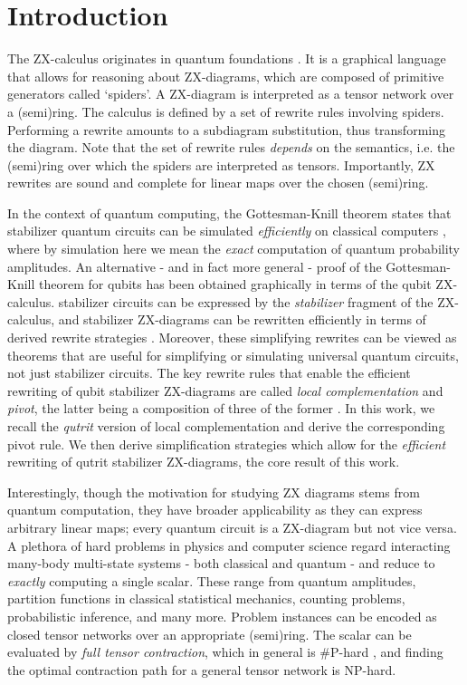 \section{Introduction}



The ZX-calculus originates in
quantum foundations \cite{Coecke2011}.
It is a graphical language that allows for reasoning about ZX-diagrams, which are composed of primitive generators \cite{vandewetering2020zxcalculus} called `spiders'.
A ZX-diagram is interpreted as a tensor network over
a (semi)ring.
The calculus
is defined by a set of rewrite rules involving spiders. Performing a rewrite amounts to a
subdiagram substitution, thus transforming the diagram.
Note that the set of rewrite rules \emph{depends} on the semantics, i.e. the (semi)ring over which the spiders are interpreted as tensors.
Importantly, ZX rewrites are sound and complete for linear maps over the chosen (semi)ring.


In the context of quantum computing,
the Gottesman-Knill theorem states that stabilizer quantum
circuits can be
simulated \emph{efficiently} on classical computers \cite{Aaronson2004},
where by simulation here we mean the \emph{exact} computation of quantum probability amplitudes.
An alternative - and in fact more general - proof of the Gottesman-Knill theorem for qubits has been obtained graphically in terms of the qubit ZX-calculus.
stabilizer circuits can be expressed by the \emph{stabilizer}
fragment of the ZX-calculus,
and stabilizer ZX-diagrams can be rewritten efficiently
in terms of derived rewrite strategies \cite{graph_theoretic_simplification}.
Moreover, these simplifying rewrites can be viewed as theorems
that are useful for simplifying or simulating universal quantum circuits, not just stabilizer circuits.
The key rewrite rules that enable the efficient rewriting
of qubit stabilizer ZX-diagrams
are called \emph{local complementation} and \emph{pivot},
the latter being a composition of three of the former \cite{graph_theoretic_simplification}.
In this work, we recall the \emph{qutrit} version of local complementation \cite{harny_completeness} and derive the corresponding pivot rule.
We then derive simplification strategies
which allow for the \emph{efficient} rewriting of qutrit stabilizer ZX-diagrams,
the core result of this work.



Interestingly, though the motivation for studying ZX diagrams stems from quantum computation, they have broader applicability as they
can express arbitrary linear maps;
every quantum circuit is a ZX-diagram but not vice versa.
A plethora of hard problems in physics and computer science
regard interacting many-body multi-state systems - both classical and quantum -
and reduce to \emph{exactly} computing a single scalar.
These range from quantum amplitudes,
partition functions in classical statistical mechanics,
counting problems, probabilistic inference, and many more.
Problem instances can be encoded as closed
tensor networks over an appropriate (semi)ring.
The scalar can be evaluated by \emph{full tensor contraction},
which in general is \#P-hard \cite{Damm2002},
and finding the optimal contraction path for a general tensor network is NP-hard.


